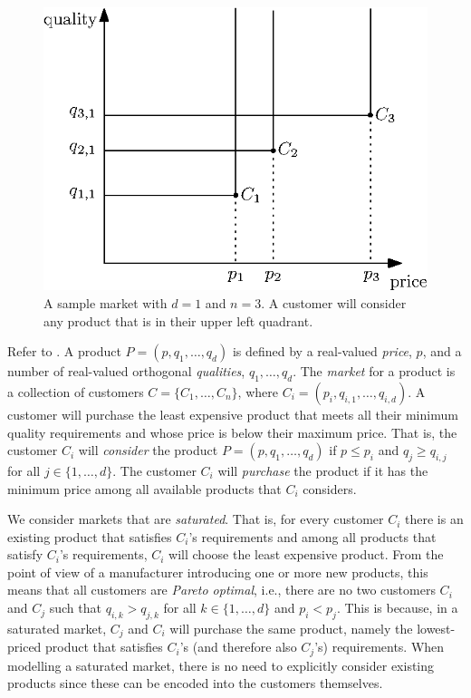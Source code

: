 \documentclass{llncs}
\begin{document}
\begin{figure}
  \begin{center}
    \includegraphics{intro}
  \end{center}
  \caption{A sample market with $d=1$ and $n=3$. A customer will consider
           any product that is in their upper left quadrant.}
\end{figure}

Refer to .  A product $P=(p,q_1,\ldots,q_d)$ is defined by a
real-valued \emph{price}, $p$, and a number of real-valued orthogonal
\emph{qualities}, $q_1,\ldots,q_d$.  The \emph{market} for a product is a
collection of customers $C=\{C_1,\ldots,C_n\}$, where
$C_i=(p_i,q_{i,1},\ldots,q_{i,d})$.  A customer will purchase the least
expensive product that meets all their minimum quality requirements and
whose price is below their maximum price.  That is, the customer $C_i$ will
\emph{consider} the product $P=(p,q_1,\ldots,q_d)$ if $p \le p_i$ and $q_j
\ge q_{i,j}$ for all $j\in\{1,\ldots,d\}$.  The customer $C_i$ will
\emph{purchase} the product if it has the minimum price among all available
products that $C_i$ considers.

We consider markets that are \emph{saturated}.  That is, for every customer
$C_i$ there is an existing product that satisfies $C_i$'s
requirements and among all products that satisfy $C_i$'s requirements,
$C_i$ will choose the least expensive product.  From the point of view of a
manufacturer introducing one or more new products, this means that all
customers are \emph{Pareto optimal}, i.e., there are no two customers $C_i$
and $C_j$ such that $q_{i,k} > q_{j,k}$ for all $k\in\{1,\ldots,d\}$ and
$p_i < p_j$.  This is because, in a saturated market, $C_j$ and $C_i$ will
purchase the same product, namely the lowest-priced product that satisfies
$C_i$'s (and therefore also $C_j$'s) requirements.  When modelling a
saturated market, there is no need to explicitly consider existing products
since these can be encoded into the customers themselves.
\end{document}
